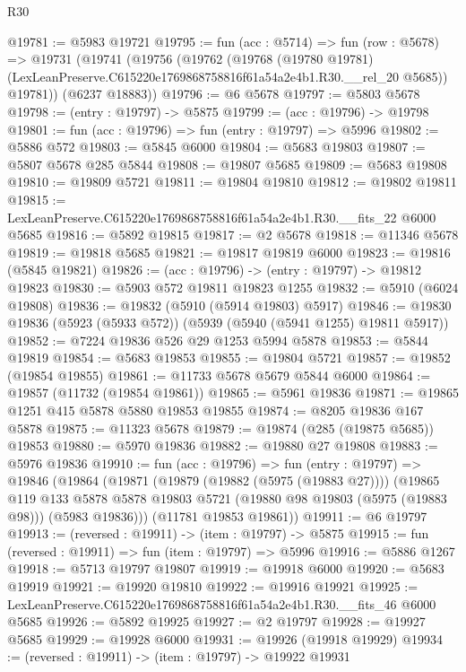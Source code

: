 \begin{lexlean}{R30}
\begin{coremodule}
@19781 := @5983 @19721
@19795 := fun (acc : @5714) =>
  fun (row : @5678) =>
  @19731
    (@19741
      (@19756
        (@19762
          (@19768
            (@19780 @19781)
            (LexLeanPreserve.C615220e1769868758816f61a54a2e4b1.R30.__rel_20 @5685))
          @19781))
      (@6237 @18883))
@19796 := @6 @5678
@19797 := @5803 @5678
@19798 := (entry : @19797) -> @5875
@19799 := (acc : @19796) -> @19798
@19801 := fun (acc : @19796) => fun (entry : @19797) => @5996
@19802 := @5886 @572
@19803 := @5845 @6000
@19804 := @5683 @19803
@19807 := @5807 @5678 @285 @5844
@19808 := @19807 @5685
@19809 := @5683 @19808
@19810 := @19809 @5721
@19811 := @19804 @19810
@19812 := @19802 @19811
@19815 := LexLeanPreserve.C615220e1769868758816f61a54a2e4b1.R30.__fits_22 @6000 @5685
@19816 := @5892 @19815
@19817 := @2 @5678
@19818 := @11346 @5678
@19819 := @19818 @5685
@19821 := @19817 @19819 @6000
@19823 := @19816 (@5845 @19821)
@19826 := (acc : @19796) -> (entry : @19797) -> @19812 @19823
@19830 := @5903 @572 @19811 @19823 @1255
@19832 := @5910 (@6024 @19808)
@19836 := @19832 (@5910 (@5914 @19803) @5917)
@19846 := @19830 @19836 (@5923 (@5933 @572)) (@5939 (@5940 (@5941 @1255) @19811 @5917))
@19852 := @7224 @19836 @526 @29 @1253 @5994 @5878
@19853 := @5844 @19819
@19854 := @5683 @19853
@19855 := @19804 @5721
@19857 := @19852 (@19854 @19855)
@19861 := @11733 @5678 @5679 @5844 @6000
@19864 := @19857 (@11732 (@19854 @19861))
@19865 := @5961 @19836
@19871 := @19865 @1251 @415 @5878 @5880 @19853 @19855
@19874 := @8205 @19836 @167 @5878
@19875 := @11323 @5678
@19879 := @19874 (@285 (@19875 @5685)) @19853
@19880 := @5970 @19836
@19882 := @19880 @27 @19808
@19883 := @5976 @19836
@19910 := fun (acc : @19796) =>
  fun (entry : @19797) =>
  @19846
    (@19864
      (@19871
        (@19879 (@19882 (@5975 (@19883 @27))))
        (@19865
          @119
          @133
          @5878
          @5878
          @19803
          @5721
          (@19880 @98 @19803 (@5975 (@19883 @98)))
          (@5983 @19836)))
      (@11781 @19853 @19861))
@19911 := @6 @19797
@19913 := (reversed : @19911) -> (item : @19797) -> @5875
@19915 := fun (reversed : @19911) => fun (item : @19797) => @5996
@19916 := @5886 @1267
@19918 := @5713 @19797 @19807
@19919 := @19918 @6000
@19920 := @5683 @19919
@19921 := @19920 @19810
@19922 := @19916 @19921
@19925 := LexLeanPreserve.C615220e1769868758816f61a54a2e4b1.R30.__fits_46 @6000 @5685
@19926 := @5892 @19925
@19927 := @2 @19797
@19928 := @19927 @5685
@19929 := @19928 @6000
@19931 := @19926 (@19918 @19929)
@19934 := (reversed : @19911) -> (item : @19797) -> @19922 @19931

\end{coremodule}
\end{lexlean}
